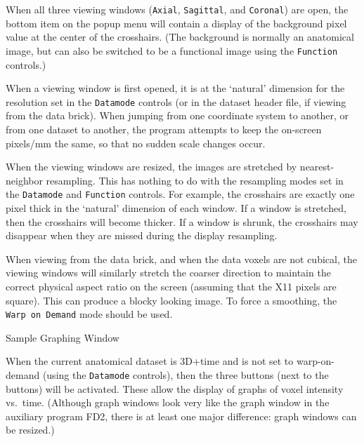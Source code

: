 When
all three viewing windows ({\tt Axial}, {\tt Sagittal}, and {\tt Coronal})
are open, the bottom item on the popup
menu will contain a display of the background pixel value at the center
of the crosshairs.  (The background is normally an anatomical image, but
can also be switched to be a functional image using the {\tt Function} controls.)

When a viewing window is first opened, it is at the `natural' dimension
for the resolution set in the {\tt Datamode} controls (or in the dataset
header file, if viewing from the data brick).  When jumping from one
coordinate system to another, or from one dataset to another, the
program attempts to keep the on-screen pixels/mm the same, so that no
sudden scale changes occur.

When the viewing windows are resized, the images are stretched by
nearest-neighbor resampling.  This has nothing to do with the resampling
modes set in the {\tt Datamode} and {\tt Function} controls.  For example,
the crosshairs are exactly one pixel thick in the `natural' dimension of
each window.  If a window is stretched, then the crosshairs will become
thicker.  If a window is shrunk, the crosshairs may disappear when they
are missed during the display resampling.

When viewing from the data brick, and when the data voxels are not cubical,
the viewing windows will similarly stretch the coarser direction to maintain
the correct physical aspect ratio on the screen (assuming that the X11 pixels
are square).  This can produce a blocky looking image.  To force a smoothing,
the {\tt Warp~on~Demand} mode should be used.
\vspace{2ex}\goodbreak\begin{samepage}
\centerline{\epsfxsize=5in}\vspace{1ex}
\centerline{\sf Sample Graphing Window}
\end{samepage}\goodbreak\vspace{1ex}


When the current anatomical dataset is 3D+time and is not set to
warp-on-demand (using the {\tt Datamode} controls), then the
three  buttons (next to the  buttons) will be activated.
These allow the display of graphs of voxel intensity vs.\ time.
(Although \afnit graph windows look very like the graph window in the auxiliary program
{\sf FD2}, there is at least one major difference: \afnit graph windows
can be resized\seeme{}.)


